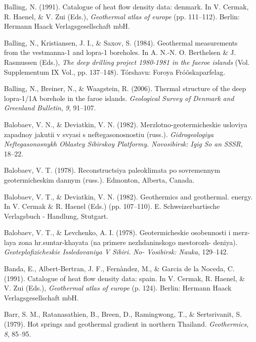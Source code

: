 \documentclass[draft,linenumbers]{agujournal2018}
\begin{document}
\leavevmode{}%
Balling, N. (1991). Catalogue of heat flow density data: denmark. In V.
Cermak, R. Haenel, \& V. Zui (Eds.), \emph{Geothermal atlas of europe}
(pp. 111--112). Berlin: Hermann Haack Verlagsgesellschaft mbH.

\leavevmode{}%
Balling, N., Kristiansen, J. I., \& Saxov, S. (1984). Geothermal
measurements from the vestmanna-1 and lopra-1 boreholes. In A. N.-N. O.
Berthelsen \& J. Rasmussen (Eds.), \emph{The deep drilling project
1980-1981 in the faeroe islands} (Vol. Supplementum IX Vol., pp.
137--148). T{ó}rshavn: F{o}roya Fr{ó}{õ}skaparfelag.

\leavevmode{}%
Balling, N., Breiner, N., \& Waagstein, R. (2006). Thermal structure of
the deep lopra-1/1A borehole in the faroe islands. \emph{Geological
Survey of Denmark and Greenland Bulletin}, \emph{9}, 91--107.

\leavevmode{}%
Balobaev, V. N., \& Deviatkin, V. N. (1982). Merzlotno-geotermicheskie
usloviya zapadnoy jakutii v svyasi s neftegasonosnostiu (russ.).
\emph{Gidrogeologiya Neftegasonosnykh Oblastey Sibirskoy Platformy.
Novosibirsk: Igig So an SSSR}, 18--22.

\leavevmode{}%
Balobaev, V. T. (1978). Reconstructsiya paleoklimata po sovremennym
geotermicheskim dannym (russ.). Edmonton, Alberta, Canada.

\leavevmode{}%
Balobaev, V. T., \& Deviatkin, V. N. (1982). Geothermics and geothermal.
energy. In V. Cermak \& R. Haenel (Eds.) (pp. 107--110). E.
Schweizerbartische Verlagsbuch - Handlung, Stutgart.

\leavevmode{}%
Balobaev, V. T., \& Levchenko, A. I. (1978). Geotermicheskie osobennosti
i merz- laya zona hr.suntar-khayata (na primere nezhdaninskogo
mestorozh- deniya). \emph{Geoteplofizicheskie Issledovaniya V Sibiri.
No- Vosibirsk: Nauka}, 129--142.

\leavevmode{}%
Banda, E., Albert-Bertran, J. F., Fernàndez, M., \& Garcia de la Noceda,
C. (1991). Catalogue of heat flow density data: spain. In V. Cermak, R.
Haenel, \& V. Zui (Eds.), \emph{Geothermal atlas of europe} (p. 124).
Berlin: Hermann Haack Verlagsgesellschaft mbH.

\leavevmode{}%
Barr, S. M., Ratanasathien, B., Breen, D., Ramingwong, T., \&
Sertsrivanit, S. (1979). Hot springs and geothermal gradient in northern
{Thailand}. \emph{Geothermics}, \emph{8}, 85--95.
\end{document}
